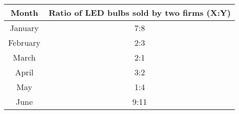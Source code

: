         \begin{tabular}{|c|c|}
            \hline
            Month & Ratio of LED bulbs sold by two firms (X:Y) \\
            \hline
            January &  7:8 \\
            February &  2:3 \\
            March & 2:1 \\
            April & 3:2 \\
            May & 1:4 \\
            June & 9:11 \\
            \hline
        \end{tabular}
        
